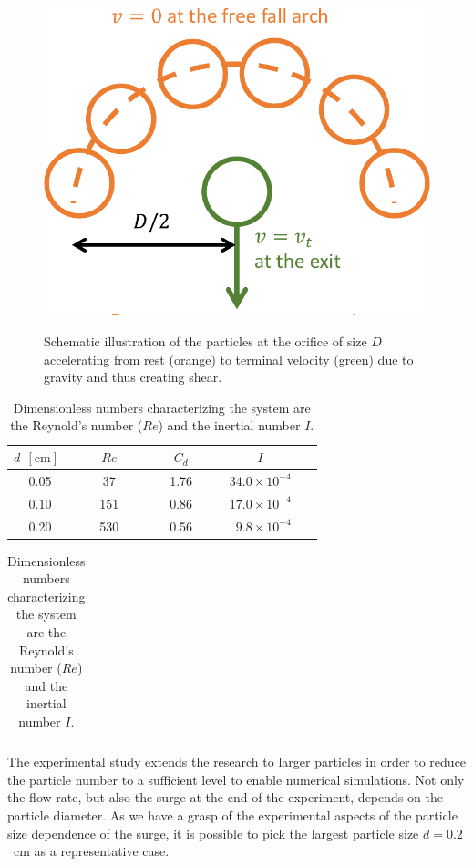 \documentclass[twoside,twocolumn,9pt]{article}
\begin{document}
%
\begin{figure}[!t]
\centering
\includegraphics[width=0.7\columnwidth]{fig5-schematic_freefall.pdf}\\
 
\caption{Schematic illustration of the particles at the orifice of size $D$ accelerating from rest (orange) to terminal velocity (green) due to gravity and thus creating shear.
\label{fig:freefall}}
\end{figure}


\begin{table}[!b]
\caption{Dimensionless numbers characterizing the system are
 the Reynold's number ($Re$) and the inertial number $I$.
 }\label{tab:dimensionless}
\setlength{\extrarowheight}{2pt}
  \begin{tabular*}{0.5\textwidth}{@{\extracolsep{\fill}}cccrr}
    \hline
$d~~\mathrm{[cm]}$~	& ~~~$Re$~~~ 	& ~~~$C_d$~~~	&\multicolumn{1}{c}{~$I$~ }\\[2pt]
\hline
0.05				& 37						& 1.76		&~$34.0 \times 10^{-4}$~\\
0.10				& 151						& 0.86		&~$17.0 \times 10^{-4}$~\\
0.20				& 530						& 0.56  	&~$ 9.8 \times 10^{-4}$~\\   \hline
  \end{tabular*}

\begin{tabular}{cccrr}

\end{tabular}
\end{table}

 

The experimental study extends the research to larger particles in order
to reduce the particle number to a sufficient level to enable numerical 
simulations. 
Not only the flow rate, but also the surge at the end of the experiment, 
depends on the particle diameter. As we have a grasp of the experimental 
aspects of the particle size dependence of the surge, it is possible to 
pick the largest particle size $d=0.2$~cm as a representative case.
 
\end{document}
